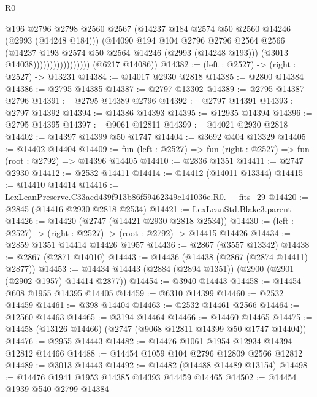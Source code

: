\begin{lexlean}{R0}
\begin{coremodule}
                                    @196
                                    @2796
                                    @2798
                                    @2560
                                    @2567
                                    (@14237 @184 @2574 @50 @2560 @14246 (@2993 (@14248 @184)))
                                    (@14090
                                      @194
                                      @104
                                      @2796
                                      @2796
                                      @2564
                                      @2566
                                      (@14237 @193 @2574 @50 @2564 @14246 (@2993 (@14248 @193)))
                                      (@3013 @14038)))))))))))))))))
      (@6217 @14086))
@14382 := (left : @2527) -> (right : @2527) -> @13231
@14384 := @14017 @2930 @2818
@14385 := @2800 @14384
@14386 := @2795 @14385
@14387 := @2797 @13302
@14389 := @2795 @14387 @2796
@14391 := @2795 @14389 @2796
@14392 := @2797 @14391
@14393 := @2797 @14392
@14394 := @14386 @14393
@14395 := @12935 @14394
@14396 := @2795 @14395
@14397 := @9061 @12811
@14399 := @14021 @2930 @2818
@14402 := @14397 @14399 @50 @1747
@14404 := @3692 @404 @13329
@14405 := @14402 @14404
@14409 := fun (left : @2527) => fun (right : @2527) => fun (root : @2792) => @14396 @14405
@14410 := @2836 @1351
@14411 := @2747 @2930
@14412 := @2532 @14411
@14414 := @14412 (@14011 @13344)
@14415 := @14410 @14414
@14416 := LexLeanPreserve.C33acd439f913b86f59462349c141036e.R0.__fits_29
@14420 := @2845 (@14416 @2930 @2818 @2534)
@14421 := LexLeanStd.Blake3.parent
@14426 := @14420 (@2747 (@14421 @2930 @2818 @2534))
@14430 := (left : @2527) -> (right : @2527) -> (root : @2792) -> @14415 @14426
@14434 := @2859 @1351 @14414 @14426 @1957
@14436 := @2867 (@3557 @13342)
@14438 := @2867 (@2871 @14010)
@14443 := @14436 (@14438 (@2867 (@2874 @14411) @2877))
@14453 := @14434 @14443 (@2884 (@2894 @1351)) (@2900 (@2901 (@2902 @1957) @14414 @2877))
@14454 := @3940 @14443
@14458 := @14454 @608 @1955 @14395 @14405
@14459 := @6310 @14399
@14460 := @2532 @14459
@14461 := @398 @14404
@14463 := @2532 @14461 @2566
@14464 := @12560 @14463
@14465 := @3194 @14464
@14466 := @14460 @14465
@14475 := @14458 (@13126 @14466) (@2747 (@9068 @12811 @14399 @50 @1747 @14404))
@14476 := @2955 @14443
@14482 := @14476 @1061 @1954 @12934 @14394 @12812 @14466
@14488 := @14454 @1059 @104 @2796 @12809 @2566 @12812
@14489 := @3013 @14443
@14492 := @14482 (@14488 @14489 @13154)
@14498 := @14476 @1941 @1953 @14385 @14393 @14459 @14465
@14502 := @14454 @1939 @540 @2799 @14384

\end{coremodule}
\end{lexlean}
